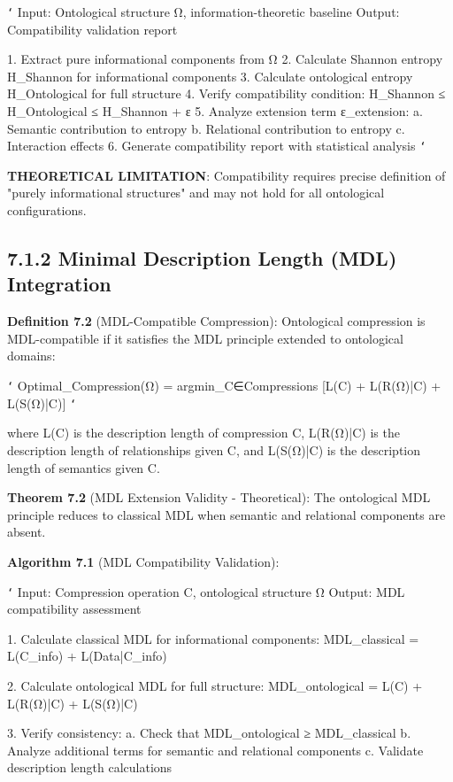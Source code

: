 \texttt{`}
Input: Ontological structure Ω, information-theoretic baseline
Output: Compatibility validation report

1. Extract pure informational components from Ω
2. Calculate Shannon entropy H_Shannon for informational components
3. Calculate ontological entropy H_Ontological for full structure
4. Verify compatibility condition: H_Shannon ≤ H_Ontological ≤ H_Shannon + ε
5. Analyze extension term ε_extension:
   a. Semantic contribution to entropy
   b. Relational contribution to entropy
   c. Interaction effects
6. Generate compatibility report with statistical analysis
\texttt{`}

\textbf{THEORETICAL LIMITATION}: Compatibility requires precise definition of "purely informational structures" and may not hold for all ontological configurations.

\subsection{7.1.2 Minimal Description Length (MDL) Integration}

\textbf{Definition 7.2} (MDL-Compatible Compression): Ontological compression is MDL-compatible if it satisfies the MDL principle extended to ontological domains:

\texttt{`}
Optimal_Compression(Ω) = argmin_{C∈Compressions} [L(C) + L(R(Ω)|C) + L(S(Ω)|C)]
\texttt{`}

where L(C) is the description length of compression C, L(R(Ω)|C) is the description length of relationships given C, and L(S(Ω)|C) is the description length of semantics given C.

\textbf{Theorem 7.2} (MDL Extension Validity - Theoretical): The ontological MDL principle reduces to classical MDL when semantic and relational components are absent.

\textbf{Algorithm 7.1} (MDL Compatibility Validation):

\texttt{`}
Input: Compression operation C, ontological structure Ω
Output: MDL compatibility assessment

1. Calculate classical MDL for informational components:
   MDL_classical = L(C_info) + L(Data|C_info)
   
2. Calculate ontological MDL for full structure:
   MDL_ontological = L(C) + L(R(Ω)|C) + L(S(Ω)|C)
   
3. Verify consistency:
   a. Check that MDL_ontological ≥ MDL_classical
   b. Analyze additional terms for semantic and relational components
   c. Validate description length calculations
   
